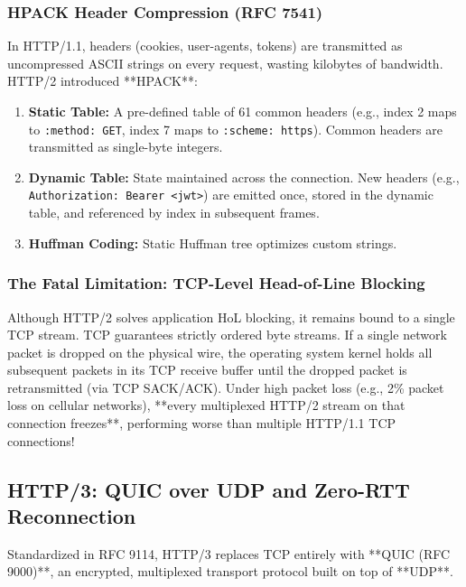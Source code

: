 \subsubsection{HPACK Header Compression (RFC 7541)}
In HTTP/1.1, headers (cookies, user-agents, tokens) are transmitted as uncompressed ASCII strings on every request, wasting kilobytes of bandwidth. HTTP/2 introduced **HPACK**:
\begin{enumerate}[leftmargin=15pt]
  \item \textbf{Static Table:} A pre-defined table of 61 common headers (e.g., index 2 maps to \texttt{:method: GET}, index 7 maps to \texttt{:scheme: https}). Common headers are transmitted as single-byte integers.
  \item \textbf{Dynamic Table:} State maintained across the connection. New headers (e.g., \texttt{Authorization: Bearer <jwt>}) are emitted once, stored in the dynamic table, and referenced by index in subsequent frames.
  \item \textbf{Huffman Coding:} Static Huffman tree optimizes custom strings.
\end{enumerate}

\subsubsection{The Fatal Limitation: TCP-Level Head-of-Line Blocking}
Although HTTP/2 solves application HoL blocking, it remains bound to a single TCP stream. TCP guarantees strictly ordered byte streams. If a single network packet is dropped on the physical wire, the operating system kernel holds all subsequent packets in its TCP receive buffer until the dropped packet is retransmitted (via TCP SACK/ACK). Under high packet loss (e.g., 2\% packet loss on cellular networks), **every multiplexed HTTP/2 stream on that connection freezes**, performing worse than multiple HTTP/1.1 TCP connections!

\subsection{HTTP/3: QUIC over UDP and Zero-RTT Reconnection}

Standardized in RFC 9114, HTTP/3 replaces TCP entirely with **QUIC (RFC 9000)**, an encrypted, multiplexed transport protocol built on top of **UDP**.

